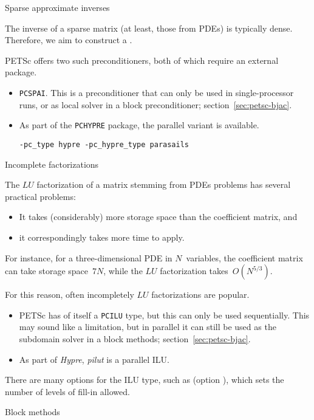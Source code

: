  {Sparse approximate inverses}

The inverse of a sparse matrix (at least, those from \acp{PDE}) is typically dense.
Therefore, we aim to construct a .

PETSc offers two such preconditioners, both of which require an external package.
\begin{itemize}
\item \lstinline{PCSPAI}. This is a preconditioner that can only be
  used in single-processor runs, or as local solver in a block
  preconditioner; section~\ref{sec:petsc-bjac}.
\item As part of the \lstinline{PCHYPRE} package, the parallel variant
   is available.
\begin{verbatim}
-pc_type hypre -pc_hypre_type parasails
\end{verbatim}
\end{itemize}

 {Incomplete factorizations}

The $LU$ factorization of a matrix stemming from \acp{PDE} problems
has several practical problems:
\begin{itemize}
\item It takes (considerably) more storage space than the coefficient matrix, and
\item it correspondingly takes more time to apply.
\end{itemize}
For instance, for a three-dimensional \ac{PDE} in $N$~variables, the coefficient matrix
can take storage space~$7N$, while the $LU$ factorization takes~$O(N^{5/3})$.

For this reason, often incompletely $LU$ factorizations are popular.
\begin{itemize}
\item PETSc has of itself a \lstinline{PCILU} type, but this can only be used sequentially.
  This may sound like a limitation, but in parallel it can still be used as the
  subdomain solver in a block methods; section~\ref{sec:petsc-bjac}.
\item As part of \emph{Hypre}, \emph{pilut} is a parallel ILU.
\end{itemize}

There are many options for the ILU type, such as
(option ),
which sets the number of levels of fill-in allowed.

 {Block methods}
\label{sec:petsc-bjac}

